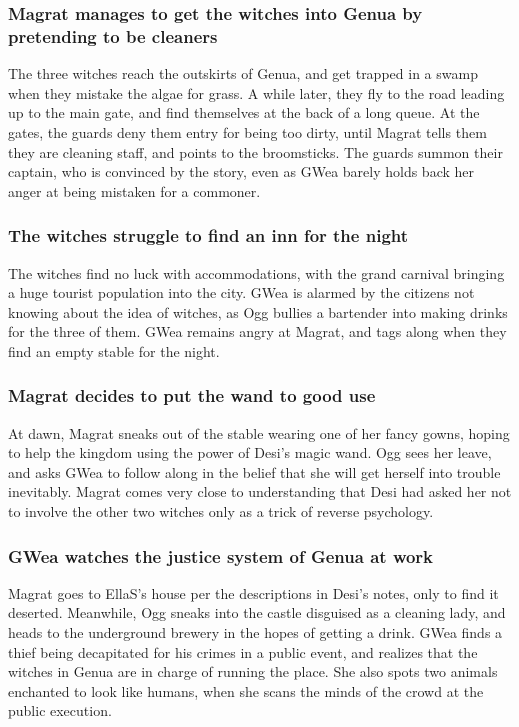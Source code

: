 \subsubsection{\Gls{Magrat} manages to get the witches into Genua by pretending to be cleaners}
The three witches reach the outskirts of Genua, and get trapped in a swamp when they mistake the
algae for grass. A while later, they fly to the road leading up to the main gate, and find
themselves at the back of a long queue. At the gates, the guards deny them entry for being too
dirty, until \Gls{Magrat} tells them they are cleaning staff, and points to the broomsticks. The
guards summon their captain, who is convinced by the story, even as \Gls{GWea} barely holds back her
anger at being mistaken for a commoner.

\subsubsection{The witches struggle to find an inn for the night}
The witches find no luck with accommodations, with the grand carnival bringing a huge tourist
population into the city. \Gls{GWea} is alarmed by the citizens not knowing about the idea of
witches, as \Gls{Ogg} bullies a bartender into making drinks for the three of them. \Gls{GWea}
remains angry at \Gls{Magrat}, and tags along when they find an empty stable for the night.

\subsubsection{\Gls{Magrat} decides to put the wand to good use}
At dawn, \Gls{Magrat} sneaks out of the stable wearing one of her fancy gowns, hoping to help the
kingdom using the power of \Gls{Desi}'s magic wand. \Gls{Ogg} sees her leave, and asks \Gls{GWea}
to follow along in the belief that she will get herself into trouble inevitably. \Gls{Magrat} comes
very close to understanding that \Gls{Desi} had asked her not to involve the other two witches only
as a trick of reverse psychology.

\subsubsection{\Gls{GWea} watches the justice system of Genua at work}
\Gls{Magrat} goes to \Gls{EllaS}'s house per the descriptions in \Gls{Desi}'s notes, only to find it
deserted. Meanwhile, \Gls{Ogg} sneaks into the castle disguised as a cleaning lady, and heads to the
underground brewery in the hopes of getting a drink. \Gls{GWea} finds a thief being decapitated for
his crimes in a public event, and realizes that the witches in Genua are in charge of running the
place. She also spots two animals enchanted to look like humans, when she scans the minds of the
crowd at the public execution.

